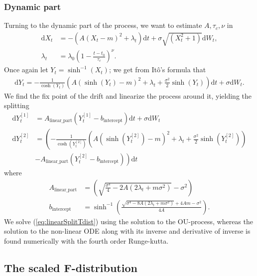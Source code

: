 \subsubsection{Dynamic part}
Turning to the dynamic part of the process, we want to estimate $A, \tau_c, \nu$ in
\begin{align}
    \mathrm{d}X_t &= -\left(A(X_t - m)^2 + \lambda_t\right)\mathrm{d}t + \sigma \sqrt{\left(X_t^2 + 1\right)}\mathrm{d}W_t,\\
    \lambda_t &= \lambda_0 \left(1 - \frac{t - t_0}{\tau_c}\right)^\nu.
\end{align}
Once again let $Y_t = \sinh^{-1}(X_t)$; we get from Itô's formula that
\begin{align}
    \mathrm{d}Y_t = -\frac{1}{\cosh(Y_t)}\left(A\left(\sinh(Y_t) - m\right)^2 + \lambda_t + \frac{\sigma^2}{2}\sinh(Y_t)\right)\mathrm{d}t + \sigma \mathrm{d}W_t.
\end{align}
We find the fix point of the drift and linearize the process around it, yielding the splitting
\begin{align}
    \mathrm{d}Y_t^{[1]} &= A_{\textrm{linear\_part}}\left(Y_t^{[1]} - b_{\textrm{intercept}}\right)\mathrm{d}t + \sigma \mathrm{d}W_t \label{eq:linearSplitTdist} \\
    \mathrm{d}Y_t^{[2]} &= \left(-\frac{1}{\cosh(Y_t^{[2]})}\left(A\left(\sinh(Y_t^{[2]}) - m\right)^2 + \lambda_t + \frac{\sigma^2}{2}\sinh(Y_t^{[2]})\right)\right.\\
     &\left.- A_{\textrm{linear\_part}}\left(Y_t^{[2]} - b_{\textrm{intercept}}\right)\right)\mathrm{d}t
\end{align}
where 
\begin{align}
    A_{\textrm{linear\_part}} &= \left(\sqrt{\frac{\sigma^4}{4} - 2A\left(2\lambda_t + m\sigma^2\right)}-\sigma^2\right)\\
    b_{\textrm{intercept}} &= \sinh^{-1}\left(\frac{\sqrt{\sigma^4 - 8A\left(2\lambda_t + m \sigma^2\right)} + 4 Am - \sigma^2}{4A}\right).
\end{align}
We solve (\ref{eq:linearSplitTdist}) using the solution to the OU-process, whereas the solution to the non-linear ODE along with its inverse and derivative of inverse is found numerically with the fourth order Runge-kutta.
\subsection{The scaled F-distribution}
